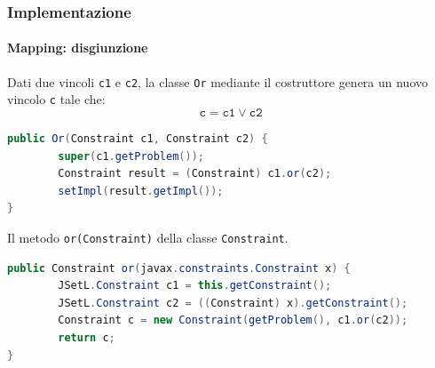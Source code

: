 \documentclass{beamer}
\begin{document}
\begin{frame}[fragile]
\frametitle{Implementazione}
\framesubtitle{Mapping: disgiunzione}
Dati due vincoli \texttt{c1} e \texttt{c2},  la classe \texttt{Or} mediante
il costruttore genera un nuovo vincolo \texttt{c} tale che:
\[\texttt{c} = \texttt{c1} \vee \texttt{c2}\]

\begin{lstlisting}[language = Java, linewidth = 200pt]
public Or(Constraint c1, Constraint c2) {
        super(c1.getProblem());
        Constraint result = (Constraint) c1.or(c2);
        setImpl(result.getImpl());
}
\end{lstlisting}

\pause
\begin{flushleft}
Il metodo \texttt{or(Constraint)} della classe \texttt{Constraint}.
\begin{lstlisting}[language = Java, linewidth = 280pt]
public Constraint or(javax.constraints.Constraint x) {
        JSetL.Constraint c1 = this.getConstraint();
        JSetL.Constraint c2 = ((Constraint) x).getConstraint();
        Constraint c = new Constraint(getProblem(), c1.or(c2));
        return c;
}
\end{lstlisting}
\end{flushleft}
\end{frame}
\end{document}
